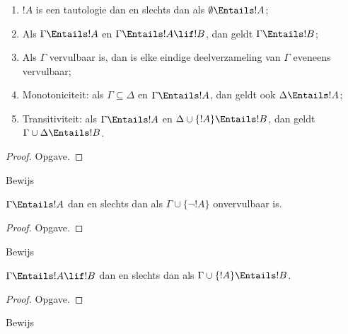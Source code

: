 \documentclass[openany]{memoir}
\begin{document}
\begin{prop}
\begin{enumerate} 
\item $!A$ is een tautologie dan en slechts dan als
  $\emptyset \Entails !A$; 
\item Als $\Gamma \Entails !A$ en $\Gamma \Entails !A \lif !B$, dan
  geldt $\Gamma \Entails !B$;
\item Als $\Gamma$ vervulbaar is, dan is elke eindige deelverzameling
  van $\Gamma$ eveneens vervulbaar; 
\item {} Monotoniciteit: als
  $\Gamma \subseteq \Delta$ en $\Gamma \Entails !A$, dan geldt ook
  $\Delta \Entails !A$;
\item {} Transitiviteit: als $\Gamma \Entails !A$ en
  $\Delta \cup \{ !A\} \Entails !B$, dan geldt
  $\Gamma \cup \Delta \Entails !B$.
\end{enumerate}
\end{prop}

\begin{proof}
Opgave.
\end{proof}

\begin{prob}
Bewijs 
\end{prob}

\begin{prop}
  $\Gamma \Entails !A$ dan en slechts dan als
  $\Gamma \cup \{\lnot !A\}$ onvervulbaar is.
\end{prop}

\begin{proof}
Opgave.
\end{proof}

\begin{prob}
Bewijs 
\end{prob}

\begin{thm}
   $\Gamma \Entails !A \lif !B$ dan en
  slechts dan als $\Gamma \cup \{!A\} \Entails !B$.
\end{thm}

\begin{proof}
Opgave.
\end{proof}

\begin{prob}
Bewijs 
\end{prob}
\endgroup
\OLEndChapterHook
\end{document}
